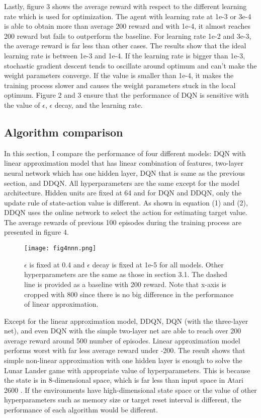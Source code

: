 \documentclass{article}
\begin{document}
Lastly, figure 3 shows the average reward with respect to the different learning rate which is used for optimization. The agent with learning rate at 1e-3 or 3e-4 is able to obtain more than average 200 reward and with 1e-4, it almost reaches 200 reward but fails to outperform the baseline. For learning rate 1e-2 and 3e-3, the average reward is far less than other cases. The results show that the ideal learning rate is between 1e-3 and 1e-4. If the learning rate is bigger than 1e-3, stochastic gradient descent tends to oscillate around optimum and can't make the weight parameters converge. If the value is smaller than 1e-4, it makes the training process slower and causes the weight parameters stuck in the local optimum. Figure 2 and 3 ensure that the performance of DQN is sensitive with the value of $\epsilon$, $\epsilon$ decay, and the learning rate.

\subsection{Algorithm comparison}
In this section, I compare the performance of four different models: DQN with linear approximation model that has linear combination of features, two-layer neural network which has one hidden layer, DQN that is same as the previous section, and DDQN.  All hyperparameters are the same except for the model architecture. Hidden units are fixed at 64 and for DQN and DDQN, only the update rule of state-action value is different.  As shown in equation (1) and (2), DDQN uses the online network to select the action for estimating target value. The average rewards of previous 100 episodes during the training process are presented in figure 4. 

\begin{figure}[H]
  \centering
    \texttt{[image: fig4nnn.png]}
  \caption{$\epsilon$ is fixed at 0.4 and $\epsilon$ decay is fixed at 1e-5 for all models. Other hyperparameters are the same as those in section 3.1. The dashed line is provided as a baseline with 200 reward. Note that x-axis is cropped with 800 since there is no big difference in the performance of linear approximation.}
\end{figure}

Except for the linear approximation model, DDQN, DQN (with the three-layer net), and even DQN with the simple two-layer net are able to reach over 200 average reward around 500 number of episodes. Linear approximation model performs worst with far less average reward under -200. The result shows that simple non-linear approximation with one hidden layer is enough to solve the Lunar Lander game with appropriate value of hyperparameters. This is because the state is in 8-dimensional space, which is far less than input space in  Atari 2600 \cite{mnih2015human}. If the environments have high-dimensional state space or the value of other hyperparameters such as memory size or target reset interval is different, the performance of each algorithm would be different. 
\end{document}
